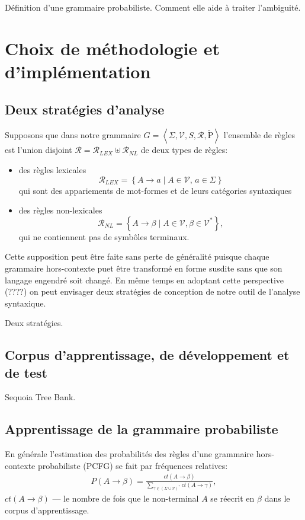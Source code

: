 \documentclass[12pt]{article}
\begin{document}
D\'efinition d'une grammaire probabiliste. Comment elle aide \`a traiter l'ambiguit\'e.


\section{Choix de m\'ethodologie et d'impl\'ementation}

\subsection{Deux strat\'egies d'analyse}

Supposons que dans notre grammaire $G = \left< \Sigma, \mathscr{V}, S, \mathscr{R}, \tilde{\mathrm{P}} \right>$ l'ensemble de r\`egles est l'union disjoint $\mathscr{R} = \mathscr{R}_{LEX} \uplus \mathscr{R}_{NL}$ de deux types de r\`egles:
\begin{itemize}
\item des r\`egles lexicales
$$\mathscr{R}_{LEX} = \left\{ A \rightarrow a \mid
        A \in \mathscr{V}, \, a \in \Sigma \right\}$$
qui sont des appariements de mot-formes et de leurs cat\'egories syntaxiques
\item des r\`egles non-lexicales
$$\mathscr{R}_{NL} = \left\{ A \rightarrow \beta \mid
     A \in \mathscr{V}, \beta \in \mathscr{V}^* \right\},$$
qui ne contiennent pas de symb\^oles terminaux.
\end{itemize}

Cette supposition peut \^etre faite sans perte de g\'en\'eralit\'e puisque chaque grammaire hors-contexte puet \^etre transform\'e en forme susdite sans que son langage engendr\'e soit chang\'e. En m\^eme temps en adoptant cette perspective (????) on peut envisager deux strat\'egies de conception de notre outil de l'analyse syntaxique.

Deux strat\'egies.

\subsection{Corpus d'apprentissage, de d\'eveloppement et de test}

Sequoia Tree Bank. \cite{Sequoia}

\subsection{Apprentissage de la grammaire probabiliste}

En g\'en\'erale l'estimation des probabilit\'es des r\`egles d'une grammaire hors-contexte probabiliste (PCFG)
se fait par fr\'equences relatives:
\begin{eqnarray}
P(A \rightarrow \beta) = \frac{ct(A \rightarrow \beta)}{\sum\limits_{\gamma \in (\Sigma \cup \mathcal{V})^*}{ct(A \rightarrow \gamma)}},
\end{eqnarray}
$ct(A \rightarrow \beta)$ --- le nombre de fois que le non-terminal $A$ se r\'eecrit en $\beta$ dans le corpus d'apprentissage.
\end{document}
